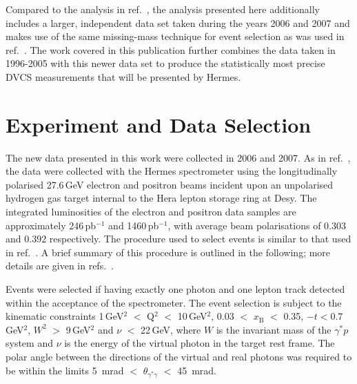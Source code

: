 \documentclass[11pt,a4paper]{article}
\begin{document}
Compared to the analysis in ref.~\cite{Air09}, the analysis presented here additionally includes a larger, independent data set taken during the years 2006 and 2007 and makes use of the same missing-mass technique for event selection as was used in ref.~\cite{Air09}. The work covered in this publication further combines the data taken in 1996-2005 with this newer data set to produce the statistically most precise DVCS measurements that will be presented by H{\sc ermes}.
\section{Experiment and Data Selection}
The new data presented in this work were collected in 2006 and 2007. As in ref.~\cite{Air09}, the data were collected with the H{\sc ermes}
spectrometer \cite{Ack98} using the longitudinally polarised 27.6\,GeV
electron and positron beams incident upon an unpolarised hydrogen gas
target internal to the H{\sc era} lepton storage ring at D{\sc esy}. The integrated luminosities of the electron and positron data samples are
approximately 246\,pb$^{-1}$ and 1460\,pb$^{-1}$, with average beam polarisations of $0.303$ and $0.392$ respectively. The procedure used to select events is similar to that used in ref.~\cite{Air09}. A brief summary of this procedure is outlined in the following; more details are given in refs.~\cite{Zei09,Bur10}.

Events were selected if having exactly one photon and one lepton
track detected within the acceptance of the spectrometer.
The event selection is subject to the kinematic constraints 1\,GeV$^{2}$ $<$
Q$^{2}$ $<$ 10\,GeV$^{2}$, 0.03 $<$ $x_{\textrm{B}}$ $<$ 0.35,
$-t < 0.7$\,GeV$^2$, $W^{2}$ $>$
9\,GeV$^{2}$ and $\nu$ $<$ 22\,GeV, where $W$ is the invariant mass of the
$\gamma^{*}p$ system and $\nu$ is the energy of the virtual photon in the target
rest frame. The polar angle between the directions of the virtual and real photons was required to
be within the limits 5~mrad $<$
$\theta_{\gamma^{*}\gamma}$ $<$ 45~mrad. 
\end{document}
